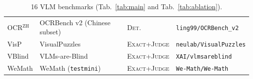 \documentclass{llmxive}
\begin{document}
\begin{table}[!htbp]
{\begin{tabular}{llll}
        OCR$^\text{ZH}$       & OCRBench v2 (Chinese subset)~\citep{fu2024ocrbench}                  & \textsc{Det.} & \texttt{ling99/OCRBench\_v2} \\
        VisP                  & VisualPuzzles~\citep{song2025visualpuzzles}                                 & \textsc{Exact+Judge} & \texttt{neulab/VisualPuzzles} \\
        VBlind                & VLMs-are-Blind~\citep{rahmanzadehgervi2024vision}                                & \textsc{Exact+Judge} & \texttt{XAI/vlmsareblind} \\
        WeMath                & WeMath (\texttt{testmini})~\citep{qiao2024we}                   & \textsc{Exact+Judge} & \texttt{We-Math/We-Math} \\
        \bottomrule
    \end{tabular}}
    \caption{16 VLM benchmarks (Tab.~\ref{tab:main} and Tab.~\ref{tab:ablation}).}
    \label{tab:appendix:vlm_benchmarks}
\end{table}
\end{document}
